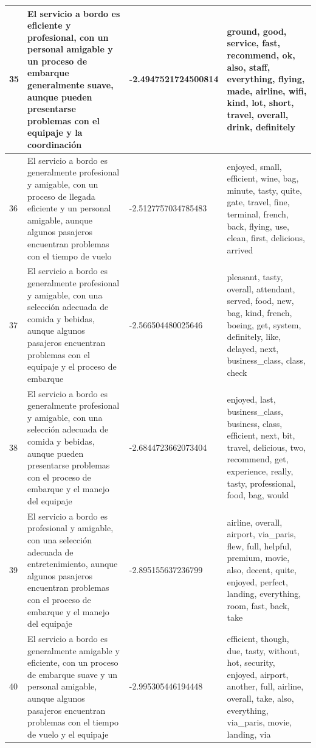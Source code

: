 \documentclass{report}
\begin{document}
{\begin{longtable}{|p{1cm}|p{4cm}|p{4cm}|p{6cm}|}
                    \hline
                    35 & El servicio a bordo es eficiente y profesional, con un personal amigable y un proceso de embarque generalmente suave, aunque pueden presentarse problemas con el equipaje y la coordinación & -2.4947521724500814 & ground, good, service, fast, recommend, ok, also, staff, everything, flying, made, airline, wifi, kind, lot, short, travel, overall, drink, definitely \\
                    \hline
                    36 & El servicio a bordo es generalmente profesional y amigable, con un proceso de llegada eficiente y un personal amigable, aunque algunos pasajeros encuentran problemas con el tiempo de vuelo & -2.5127757034785483 & enjoyed, small, efficient, wine, bag, minute, tasty, quite, gate, travel, fine, terminal, french, back, flying, use, clean, first, delicious, arrived \\
                    \hline
                    37 & El servicio a bordo es generalmente profesional y amigable, con una selección adecuada de comida y bebidas, aunque algunos pasajeros encuentran problemas con el equipaje y el proceso de embarque & -2.566504480025646 & pleasant, tasty, overall, attendant, served, food, new, bag, kind, french, boeing, get, system, definitely, like, delayed, next, business\_class, class, check \\
                    \hline
                    38 & El servicio a bordo es generalmente profesional y amigable, con una selección adecuada de comida y bebidas, aunque pueden presentarse problemas con el proceso de embarque y el manejo del equipaje & -2.6844723662073404 & enjoyed, last, business\_class, business, class, efficient, next, bit, travel, delicious, two, recommend, get, experience, really, tasty, professional, food, bag, would \\
                    \hline
                    39 & El servicio a bordo es profesional y amigable, con una selección adecuada de entretenimiento, aunque algunos pasajeros encuentran problemas con el proceso de embarque y el manejo del equipaje & -2.895155637236799 & airline, overall, airport, via\_paris, flew, full, helpful, premium, movie, also, decent, quite, enjoyed, perfect, landing, everything, room, fast, back, take \\
                    \hline
                    40 & El servicio a bordo es generalmente amigable y eficiente, con un proceso de embarque suave y un personal amigable, aunque algunos pasajeros encuentran problemas con el tiempo de vuelo y el equipaje & -2.995305446194448 & efficient, though, due, tasty, without, hot, security, enjoyed, airport, another, full, airline, overall, take, also, everything, via\_paris, movie, landing, via \\

\end{longtable}}
\end{document}

